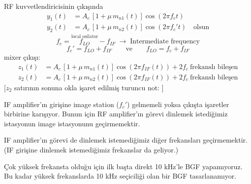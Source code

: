 \documentclass[11pt,a4paper]{article}
\begin{document}
RF kuvvetlendiricisinin çıkışında
\begin{align*}
y_1(t) &= A_c\,[1+\mu\, m_{n1}(t)]\cos(2\pi f_c t)\\
y_2(t) &= A_c\,[1+\mu\, m_{n2}(t)]\cos(2\pi f_c' t) \quad\text{olsun}
\end{align*}
\[ f_c=\overset{\text{local osilator}}{f_{LO}}-f_{IF} \;\to\; \text{Intermediate frequency} \]
\[ f_c'=f_{LO}+f_{IF} \qquad\text{ve}\qquad f_{LO}=f_c+f_{IF} \]
mixer çıkışı:
\begin{align*}
z_1(t) &= A_c\,[1+\mu\, m_{n1}(t)]\cos(2\pi f_{IF}(t)) + 2f_c\ \text{frekanslı bileşen}\\
z_2(t) &= A_c\,[1+\mu\, m_{n2}(t)]\cos(2\pi f_{IF}(t)) + 2f_c\ \text{frekanslı bileşen}
\end{align*}
[$z_2$ satırının sonuna okla işaret edilmiş turuncu not: ]

IF amplifier'ın girişine image station ($f_c'$) gelmemeli yoksa çıkışta işaretler birbirine karışıyor. Bunun için RF amplifier'ın görevi dinlemek istediğimiz istasyonun image istasyonunu geçirmemektir.

IF amplifier'ın görevi de dinlemek istemediğimiz diğer frekansları geçirmemektir. (IF girişine dinlemek istemediğimiz frekanslar da geliyor.)

Çok yüksek frekansta olduğu için ilk başta direkt 10 kHz'le BGF yapamıyoruz. Bu kadar yüksek frekanslarda 10 kHz seçiciliği olan bir BGF tasarlanamıyor.

\end{document}
